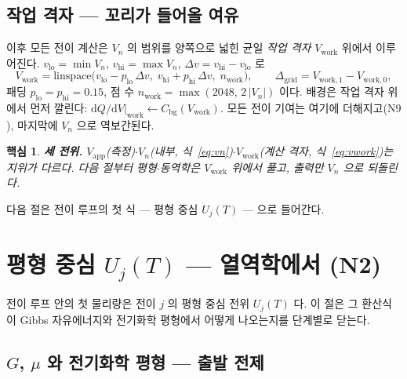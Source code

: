 \documentclass[11pt,a4paper]{article}
\newtheorem*{keybox}{핵심}
\newcommand{\dd}{\mathrm{d}}
\newcommand{\app}{\mathrm{app}}
\newcommand{\bg}{\mathrm{bg}}
\newcommand{\work}{\mathrm{work}}
\begin{document}
\subsection{작업 격자 — 꼬리가 들어올 여유}
이후 모든 전이 계산은 $V_n$ 의 범위를 양쪽으로 넓힌 균일 \emph{작업 격자} $V_\work$ 위에서 이루어진다.
$v_\mathrm{lo}=\min V_n$, $v_\mathrm{hi}=\max V_n$, $\Delta v=v_\mathrm{hi}-v_\mathrm{lo}$ 로
\begin{equation}
V_\work=\mathrm{linspace}\big(v_\mathrm{lo}-p_\mathrm{lo}\,\Delta v,\;
v_\mathrm{hi}+p_\mathrm{hi}\,\Delta v,\;n_\work\big),
\qquad \Delta_\mathrm{grid}=V_{\work,1}-V_{\work,0},
\label{eq:vwork}
\end{equation}
패딩 $p_\mathrm{lo}=p_\mathrm{hi}=0.15$, 점 수 $n_\work=\max(2048,\,2\,|V_n|)$ 이다. 배경은 작업 격자 위에서 먼저 깔린다:
$\dd Q/\dd V|_\work \leftarrow C_\bg(V_\work)$. 모든 전이 기여는 여기에 더해지고($\mathrm N9$), 마지막에 $V_n$ 으로
역보간된다.

\begin{keybox}
\textbf{세 전위.} $V_\app$(측정)$\cdot$$V_n$(내부, 식~\eqref{eq:vn})$\cdot$$V_\work$(계산 격자, 식~\eqref{eq:vwork})는
지위가 다르다. 다음 절부터 평형$\cdot$동역학은 $V_\work$ 위에서 풀고, 출력만 $V_n$ 으로 되돌린다.
\end{keybox}

다음 절은 전이 루프의 첫 식 — 평형 중심 $U_j(T)$ — 으로 들어간다.

\section{평형 중심 $U_j(T)$ — 열역학에서 (N2)}\label{sec:center}
전이 루프 안의 첫 물리량은 전이 $j$ 의 평형 중심 전위 $U_j(T)$ 다.
이 절은 그 환산식이 Gibbs 자유에너지와 전기화학 평형에서 어떻게 나오는지를 단계별로 닫는다.

\subsection{$G$, $\mu$ 와 전기화학 평형 — 출발 전제}
\end{document}

